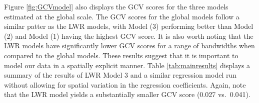 \documentclass{article}\usepackage{graphicx, color}
\begin{document}
Figure \ref{fig:GCVmodel} also displays the GCV scores for the three models estimated at the global scale. The GCV scores for the global models follow a similar patter as the LWR models, with Model (3) performing better than Model (2) and Model (1) having the highest GCV score. It is also worth noting that the LWR models have significantly lower GCV scores for a range of bandwidths when compared to the global models. These results suggest that it is important to model our data in a spatially explicit manner. Table \ref{tab:mainresults} displays a summary of the results of LWR Model 3 and a similar regression model run without allowing for spatial variation in the regression coefficients. Again, note that the LWR model yields a substantially smaller GCV score (0.027 vs.\ 0.041).

\end{document}
